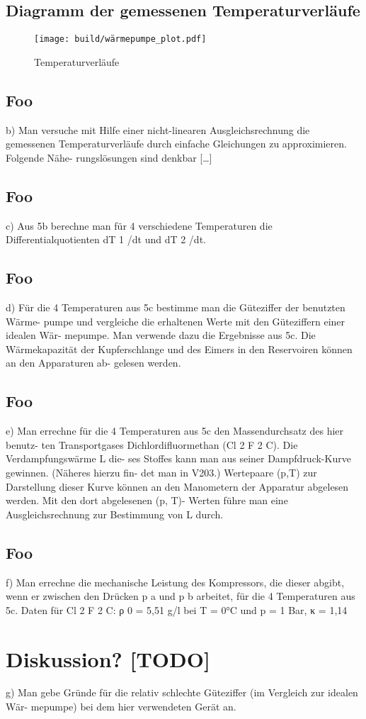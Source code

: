 \subsection{Diagramm der gemessenen Temperaturverläufe}

\begin{figure}
  \centering
  \texttt{[image: build/wärmepumpe\_plot.pdf]}
  \caption{Temperaturverläufe}
  \label{fig:plot}
\end{figure}

\subsection{Foo}
b) Man versuche mit Hilfe einer nicht-linearen Ausgleichsrechnung die gemessenen
Temperaturverläufe durch einfache Gleichungen zu approximieren. Folgende Nähe-
rungslösungen sind denkbar […]

\subsection{Foo}
c) Aus 5b berechne man für 4 verschiedene Temperaturen die Differentialquotienten
dT 1 /dt und dT 2 /dt.

\subsection{Foo}
d) Für die 4 Temperaturen aus 5c bestimme man die Güteziffer der benutzten Wärme-
pumpe und vergleiche die erhaltenen Werte mit den Güteziffern einer idealen Wär-
mepumpe. Man verwende dazu die Ergebnisse aus 5c. Die Wärmekapazität der
Kupferschlange und des Eimers in den Reservoiren können an den Apparaturen ab-
gelesen werden.

\subsection{Foo}
e) Man errechne für die 4 Temperaturen aus 5c den Massendurchsatz des hier benutz-
ten Transportgases Dichlordifluormethan (Cl 2 F 2 C). Die Verdampfungswärme L die-
ses Stoffes kann man aus seiner Dampfdruck-Kurve gewinnen. (Näheres hierzu fin-
det man in V203.) Wertepaare (p,T) zur Darstellung dieser Kurve können an den
Manometern der Apparatur abgelesen werden. Mit den dort abgelesenen (p, T)-
Werten führe man eine Ausgleichsrechnung zur Bestimmung von L durch.

\subsection{Foo}
f) Man errechne die mechanische Leistung des Kompressors, die dieser abgibt, wenn
er zwischen den Drücken p a und p b arbeitet, für die 4 Temperaturen aus 5c. Daten
für Cl 2 F 2 C: ρ 0 = 5,51 g/l bei T = 0°C und p = 1 Bar, κ = 1,14

\section{Diskussion? [TODO]}

g) Man gebe Gründe für die relativ schlechte Güteziffer (im Vergleich zur idealen Wär-
mepumpe) bei dem hier verwendeten Gerät an.


